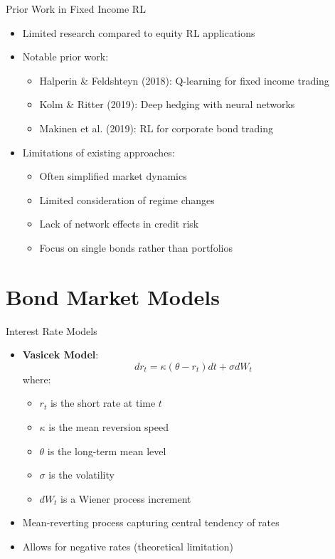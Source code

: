 \documentclass{beamer}
\begin{document}
\begin{frame}{Prior Work in Fixed Income RL}
\begin{itemize}
    \item Limited research compared to equity RL applications
    \item Notable prior work:
    \begin{itemize}
        \item Halperin \& Feldshteyn (2018): Q-learning for fixed income trading
        \item Kolm \& Ritter (2019): Deep hedging with neural networks
        \item Makinen et al. (2019): RL for corporate bond trading
    \end{itemize}
    \item Limitations of existing approaches:
    \begin{itemize}
        \item Often simplified market dynamics
        \item Limited consideration of regime changes
        \item Lack of network effects in credit risk
        \item Focus on single bonds rather than portfolios
    \end{itemize}
\end{itemize}
\end{frame}

\section{Bond Market Models}

\begin{frame}{Interest Rate Models}
\begin{itemize}
    \item \textbf{Vasicek Model}:
    \begin{equation}
    dr_t = \kappa(\theta - r_t)dt + \sigma dW_t
    \end{equation}
    where:
    \begin{itemize}
        \item $r_t$ is the short rate at time $t$
        \item $\kappa$ is the mean reversion speed
        \item $\theta$ is the long-term mean level
        \item $\sigma$ is the volatility
        \item $dW_t$ is a Wiener process increment
    \end{itemize}
    \item Mean-reverting process capturing central tendency of rates
    \item Allows for negative rates (theoretical limitation)
\end{itemize}
\end{frame}
\end{document}
